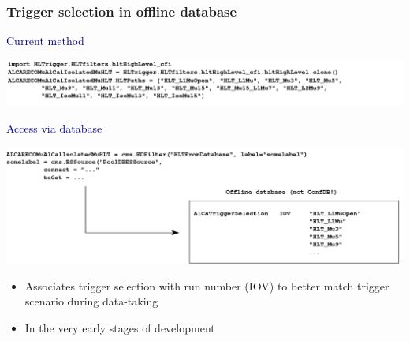 \documentclass[compress]{beamer}
\begin{document}
\begin{frame}
\frametitle{Trigger selection in offline database}

\textcolor{darkblue}{Current method}

\vspace{0.2 cm}
\includegraphics[width=\linewidth]{before_database.png}

\vfill
\textcolor{darkblue}{Access via database}

\vspace{0.2 cm}
\includegraphics[width=\linewidth]{database.png}

\vfill
\begin{itemize}
\item Associates trigger selection with run number (IOV) to better match trigger scenario during data-taking

\item In the very early stages of development
\end{itemize}
\end{frame}
\end{document}
